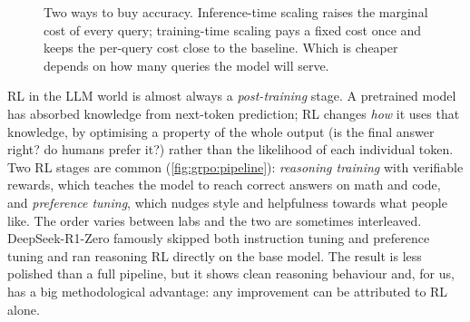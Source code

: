 \begin{figure}[ht]
\centering
{}
\caption{Two ways to buy accuracy. Inference-time scaling raises the marginal cost of
every query; training-time scaling pays a fixed cost once and keeps the per-query cost
close to the baseline. Which is cheaper depends on how many queries the model will serve.}
\label{fig:grpo:dials}
\end{figure}

RL in the LLM world is almost always a \emph{post-training} stage. A pretrained model has
absorbed knowledge from next-token prediction; RL changes \emph{how} it uses that
knowledge, by optimising a property of the whole output (is the final answer right? do
humans prefer it?) rather than the likelihood of each individual token. Two RL stages are
common (\cref{fig:grpo:pipeline}): \emph{reasoning training} with verifiable rewards,
which teaches the model to reach correct answers on math and code, and \emph{preference
tuning}, which nudges style and helpfulness towards what people like. The order varies
between labs and the two are sometimes interleaved. DeepSeek-R1-Zero famously skipped
both instruction tuning and preference tuning and ran reasoning RL directly on the base
model. The result is less polished than a full pipeline, but it shows clean reasoning
behaviour and, for us, has a big methodological advantage: any improvement can be
attributed to RL alone.

